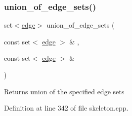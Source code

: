 \subsubsection{\texorpdfstring{union\+\_\+of\+\_\+edge\+\_\+sets()}{union\_of\_edge\_sets()}}
{\footnotesize\ttfamily set$<$\hyperlink{group___c_l_s_solvers_classedge}{edge}$>$ union\+\_\+of\+\_\+edge\+\_\+sets (\begin{DoxyParamCaption}\item[{const set$<$ \hyperlink{group___c_l_s_solvers_classedge}{edge} $>$ \&}]{,  }\item[{const set$<$ \hyperlink{group___c_l_s_solvers_classedge}{edge} $>$ \&}]{ }\end{DoxyParamCaption})}

\begin{DoxyReturn}{Returns}
union of the specified edge sets 
\end{DoxyReturn}


Definition at line 342 of file skeleton.\+cpp.

